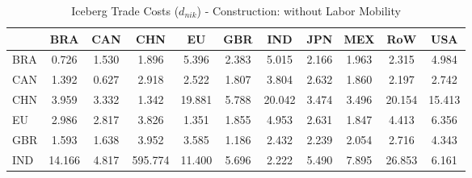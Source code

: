 \begin{table}[htbp]
\centering
\caption{Iceberg Trade Costs ($d_{nik}$) - Construction: without Labor Mobility} 
\label{tab:iceberg_Construction}
\begin{tabular}{lcccccccccc}
  \hline
 & BRA & CAN & CHN & EU & GBR & IND & JPN & MEX & RoW & USA \\ 
  \hline
BRA & \textcolor[RGB]{247,160,8}{0.726} & \textcolor[RGB]{222,144,33}{1.530} & \textcolor[RGB]{186,120,69}{1.896} & \textcolor[RGB]{36,23,219}{5.396} & \textcolor[RGB]{150,97,105}{2.383} & \textcolor[RGB]{38,25,217}{5.015} & \textcolor[RGB]{166,107,89}{2.166} & \textcolor[RGB]{181,117,74}{1.963} & \textcolor[RGB]{153,99,102}{2.315} & \textcolor[RGB]{41,26,214}{4.984} \\ 
  CAN & \textcolor[RGB]{230,148,26}{1.392} & \textcolor[RGB]{250,162,5}{0.627} & \textcolor[RGB]{97,63,158}{2.918} & \textcolor[RGB]{143,92,112}{2.522} & \textcolor[RGB]{199,129,56}{1.807} & \textcolor[RGB]{69,45,186}{3.804} & \textcolor[RGB]{122,79,133}{2.632} & \textcolor[RGB]{191,124,64}{1.860} & \textcolor[RGB]{161,104,94}{2.197} & \textcolor[RGB]{110,71,145}{2.742} \\ 
  CHN & \textcolor[RGB]{59,38,196}{3.959} & \textcolor[RGB]{89,58,166}{3.332} & \textcolor[RGB]{235,152,20}{1.342} & \textcolor[RGB]{10,7,245}{19.881} & \textcolor[RGB]{28,18,227}{5.788} & \textcolor[RGB]{8,5,247}{20.042} & \textcolor[RGB]{77,50,178}{3.474} & \textcolor[RGB]{74,48,181}{3.496} & \textcolor[RGB]{5,3,250}{20.154} & \textcolor[RGB]{13,8,242}{15.413} \\ 
  EU & \textcolor[RGB]{94,61,161}{2.986} & \textcolor[RGB]{105,68,150}{2.817} & \textcolor[RGB]{66,43,189}{3.826} & \textcolor[RGB]{232,150,23}{1.351} & \textcolor[RGB]{194,125,61}{1.855} & \textcolor[RGB]{43,28,212}{4.953} & \textcolor[RGB]{125,81,130}{2.631} & \textcolor[RGB]{196,127,59}{1.847} & \textcolor[RGB]{54,35,201}{4.413} & \textcolor[RGB]{23,15,232}{6.356} \\ 
  GBR & \textcolor[RGB]{214,139,41}{1.593} & \textcolor[RGB]{209,135,46}{1.638} & \textcolor[RGB]{61,40,194}{3.952} & \textcolor[RGB]{71,46,184}{3.585} & \textcolor[RGB]{240,155,15}{1.186} & \textcolor[RGB]{148,96,107}{2.432} & \textcolor[RGB]{156,101,99}{2.239} & \textcolor[RGB]{176,114,79}{2.054} & \textcolor[RGB]{112,73,143}{2.716} & \textcolor[RGB]{56,36,199}{4.343} \\ 
  IND & \textcolor[RGB]{15,10,240}{14.166} & \textcolor[RGB]{48,31,207}{4.817} & \textcolor[RGB]{0,0,255}{595.774} & \textcolor[RGB]{18,12,237}{11.400} & \textcolor[RGB]{31,20,224}{5.696} & \textcolor[RGB]{158,102,97}{2.222} & \textcolor[RGB]{33,21,222}{5.490} & \textcolor[RGB]{20,13,235}{7.895} & \textcolor[RGB]{3,2,252}{26.853} & \textcolor[RGB]{25,16,230}{6.161} \\ 

\end{tabular}
\end{table}

